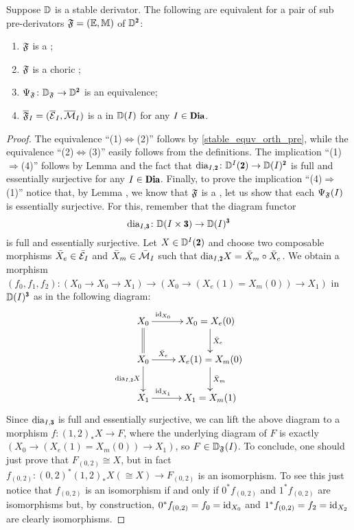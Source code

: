 \begin{theorem}\label{stable_equv_orth}
Suppose $\mathbb{D}$ is a stable derivator. The following are equivalent for a pair of sub pre-derivators $\mathfrak{F}=(\mathbb E,\mathbb M)$  of $\D^{\due}$:
\begin{enumerate}%
\item $\mathfrak{F}$ is a \dfs;
\item \color{blue}$\mathfrak{F}$ is a choric \dfs;\color{black}
\item $\Psi_\F\colon \D_\F\to \D^{\due}$ is an equivalence;
\item $\overline{\mathfrak{F}}_I=(\overline{\mathcal{E}}_I,\overline{\mathcal{M}}_I)$ is a \hfs in $\mathbb{D}(I)$ for any $I\in\Dia$.
\end{enumerate}
\end{theorem}
\begin{proof}
The equivalence ``(1)$\Leftrightarrow$(2)'' follows by \athm \ref{stable_equv_orth_pre}, while the equivalence ``(2)$\Leftrightarrow$(3)'' easily follows from the definitions. The implication ``(1)$\Rightarrow$(4)'' follows by Lemma  and the fact that $\dia_{I,\due}\colon \D^I(\due)\to \D(I)^{\due}$ is full and essentially surjective for any $I\in \Dia$. Finally, to prove the implication ``(4)$\Rightarrow$(1)'' notice that, by Lemma , we know that $\mathfrak{F}$ is a  \cpfs, let us show that each $\Psi_{\mathfrak{F}}(I)$ is essentially surjective. For this, remember that the diagram functor
\[
\dia_{I,\tre}\colon \D(I\times \tre)\to \D(I)^{\tre}
\]
is full and essentially surjective. Let $X\in \D^I(\due)$ and choose two composable morphisms $\bar X_e\in \bar {\mathcal{E}}_I$ and $\bar X_m\in \bar {\mathcal{M}}_I$ such that $\dia_{I,\due}X=\bar X_m\circ \bar X_e$. We obtain a morphism $(f_0,f_1,f_2)\colon (X_0\to X_0\to X_1)\to (X_0\to (X_e(1)=X_m(0))\to X_1)$ in $\D(I)^{\tre}$ as in the following diagram:
\[
\xymatrix{
X_0\ar@{=}[d]\ar[r]^(.3){\id_{X_0}}&X_0= X_e(0)\ar[d]^{\bar X_e}\\
X_0\ar[r]^(.3){\bar X_e}\ar[d]_{\dia_{I,\due}X}&X_e(1)=X_m(0)\ar[d]^{\bar X_m}\\
X_1\ar[r]^(.3){\id_{X_1}}&X_1=X_m(1)
}
\]
Since $\dia_{I,\tre}$ is full and essentially surjective, we can lift the above diagram to a morphism $f\colon (1,2)_*X\to F$, where the underlying diagram of $F$ is exactly $(X_0\to (X_e(1)=X_m(0))\to X_1)$, so $F\in \mathbb{D}_{\mathfrak{F}}(I)$. To conclude, one should just prove that $F_{(0,2)}\cong X$, but in fact $f_{(0,2)}\colon (0,2)^*(1,2)_*X(\cong X)\to F_{(0,2)}$ is an isomorphism. To see this just notice that $f_{(0,2)}$ is an isomorphism if and only if $0^*f_{(0,2)}$ and $1^*f_{(0,2)}$ are isomorphisms but, by construction, $0^*f_{(0,2)}=f_0=\operatorname{id}_{X_0}$ and $1^*f_{(0,2)}=f_2=\operatorname{id}_{X_2}$ are clearly isomorphisms.\qedhere
\end{proof}



